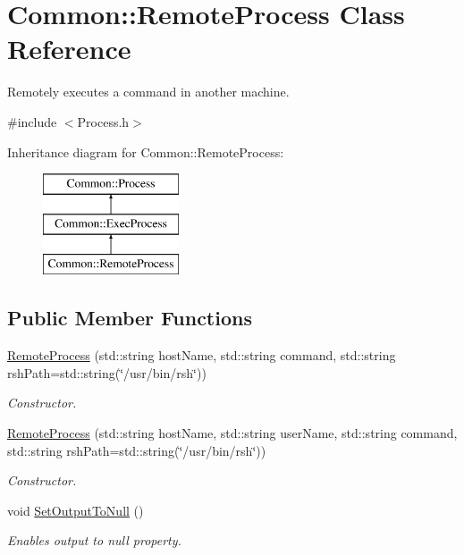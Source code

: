 \hypertarget{class_common_1_1_remote_process}{\section{Common\-:\-:Remote\-Process Class Reference}
\label{class_common_1_1_remote_process}
}


Remotely executes a command in another machine.  




{\ttfamily \#include $<$Process.\-h$>$}

Inheritance diagram for Common\-:\-:Remote\-Process\-:\begin{figure}[H]
\begin{center}
\leavevmode
\includegraphics[height=3.000000cm]{class_common_1_1_remote_process}
\end{center}
\end{figure}
\subsection*{Public Member Functions}
\begin{DoxyCompactItemize}
\item 
\hyperlink{class_common_1_1_remote_process_a4391c49d837b2b1c9f5514d09cc82f61}{Remote\-Process} (std\-::string host\-Name, std\-::string command, std\-::string rsh\-Path=std\-::string(\char`\"{}/usr/bin/rsh\char`\"{}))
\begin{DoxyCompactList}\small\item\em Constructor. \end{DoxyCompactList}\item 
\hyperlink{class_common_1_1_remote_process_afcbb01195482dc86fe8294c53ac4d422}{Remote\-Process} (std\-::string host\-Name, std\-::string user\-Name, std\-::string command, std\-::string rsh\-Path=std\-::string(\char`\"{}/usr/bin/rsh\char`\"{}))
\begin{DoxyCompactList}\small\item\em Constructor. \end{DoxyCompactList}\item 
\hypertarget{class_common_1_1_remote_process_a513136e2e9b13380a045f5d78a014afb}{void \hyperlink{class_common_1_1_remote_process_a513136e2e9b13380a045f5d78a014afb}{Set\-Output\-To\-Null} ()}\label{class_common_1_1_remote_process_a513136e2e9b13380a045f5d78a014afb}

\begin{DoxyCompactList}\small\item\em Enables output to null property. \end{DoxyCompactList}\end{DoxyCompactItemize}
